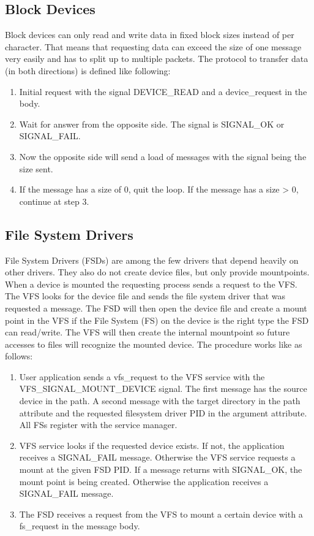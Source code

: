 
\subsection{Block Devices}
Block devices can only read and write data in fixed block sizes instead of per character.
That means that requesting data can exceed the size of one message very easily and has
to split up to multiple packets. The protocol to transfer data (in both directions)
is defined like following: \\
\begin{enumerate}
\item Initial request with the signal DEVICE\_READ and a device\_request in the body.
\item Wait for answer from the opposite side. The signal is SIGNAL\_OK or SIGNAL\_FAIL.
\item Now the opposite side will send a load of messages with the signal being the size sent.
\item If the message has a size of 0, quit the loop. If the message has a size > 0, continue at step 3.
\end{enumerate}

\subsection{File System Drivers}
File System Drivers (FSDs) are among the few drivers that depend heavily on other drivers.
They also do not create device files, but only provide mountpoints. When a device is mounted
the requesting process sends a request to the VFS. The VFS looks for the device file and
sends the file system driver that was requested a message. The FSD will then open the device file and
create a mount point in the VFS if the File System (FS) on the device is the right type the FSD
can read/write. The VFS will then create the internal mountpoint so future accesses to files
will recognize the mounted device. The procedure works like as follows: \\
\begin{enumerate}
\item User application sends a vfs\_request to the VFS service with the \\
VFS\_SIGNAL\_MOUNT\_DEVICE signal. The first message has the source device in the path. 
A second message with the target directory in the path attribute
and the requested filesystem driver PID in the argument attribute. All FSs register with the service manager.

\item VFS service looks if the requested device exists. If not, the application receives a SIGNAL\_FAIL message.
Otherwise the VFS service requests a mount at the given FSD PID. If a message returns with SIGNAL\_OK, the mount point
is being created. Otherwise the application receives a SIGNAL\_FAIL message.

\item The FSD receives a request from the VFS to mount a certain device with a fs\_request in the message body.
\end{enumerate}

